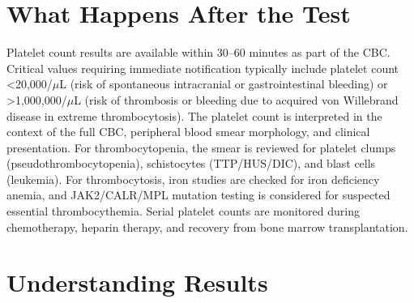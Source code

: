 \section*{What Happens After the Test}
Platelet count results are available within 30--60 minutes as part of the CBC. Critical values requiring immediate notification typically include platelet count <20,000/$\mu$L (risk of spontaneous intracranial or gastrointestinal bleeding) or >1,000,000/$\mu$L (risk of thrombosis or bleeding due to acquired von Willebrand disease in extreme thrombocytosis). The platelet count is interpreted in the context of the full CBC, peripheral blood smear morphology, and clinical presentation. For thrombocytopenia, the smear is reviewed for platelet clumps (pseudothrombocytopenia), schistocytes (TTP/HUS/DIC), and blast cells (leukemia). For thrombocytosis, iron studies are checked for iron deficiency anemia, and JAK2/CALR/MPL mutation testing is considered for suspected essential thrombocythemia. Serial platelet counts are monitored during chemotherapy, heparin therapy, and recovery from bone marrow transplantation.

\section*{Understanding Results}

